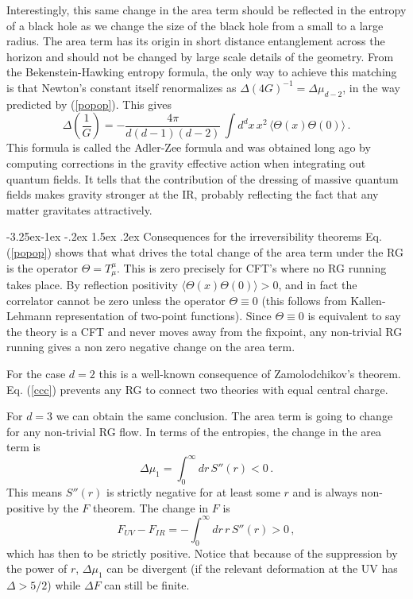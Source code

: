 \documentclass[11pt]{article}
\makeatletter
\renewcommand\subsection{\@startsection{subsection}{2}{\z@}%
                                   {-3.25ex\@plus -1ex \@minus -.2ex}%
                                     {1.5ex \@plus .2ex}%
                                     {\normalfont\bfseries}}
\numberwithin{equation}{section}
\newcommand{\be}{\begin{equation}}
\newcommand{\ee}{\end{equation}}
\makeatother
\begin{document}
\bigskip

Interestingly, this same change in the area term should be reflected in the entropy of a black hole as we change the size of the black hole from a small to a large radius. The area term has its origin in short distance entanglement across the horizon and should not be changed by large scale details of the geometry. From the Bekenstein-Hawking entropy formula, the only way to achieve this matching is that Newton's constant itself renormalizes as $\Delta (4G)^{-1}=\Delta \mu_{d-2}$, in the way predicted by (\ref{popop}). This gives
\be
\Delta \left(\frac{1}{G}\right)= -\frac{4\pi}{d (d-1)(d-2)}\,\int d^{d}x\,x^2\,\langle \Theta(x) \Theta(0)\rangle\,.
\ee
This formula is called the Adler-Zee formula and was obtained long ago by computing corrections in the gravity effective action when integrating out quantum fields. It tells that the contribution of the dressing of massive quantum fields makes gravity stronger at the IR, probably reflecting the fact that any matter gravitates attractively.     

\subsection{Consequences for the irreversibility theorems}
Eq. (\ref{popop}) shows that what drives the total change of the area term under the RG is the operator $\Theta=T_\mu^\mu$. This is zero precisely for CFT's where no RG running takes place. By reflection positivity $\langle \Theta(x) \Theta(0)\rangle>0$, and in fact the correlator cannot be zero unless the operator $\Theta\equiv 0$ (this follows from Kallen-Lehmann representation of two-point functions). Since $\Theta\equiv 0$ is equivalent to say the theory is a CFT and never moves away from the fixpoint, any non-trivial RG running gives a non zero negative change on the area term. 

For the case $d=2$ this is a well-known consequence of Zamolodchikov's theorem. Eq. (\ref{ccc}) prevents any RG to connect two theories with equal central charge.     

For $d=3$ we can obtain the same conclusion. The area term is going to change for any non-trivial RG flow. In terms of the entropies, the change in the area term is
\be
\Delta \mu_{1}= \int_0^\infty dr\, S''(r)<0\,.
\ee
This means $S''(r)$ is strictly negative for at least some $r$ and is always non-positive by the $F$ theorem. The change in $F$ is
\be
 F_{UV}-F_{IR}= -\int_0^\infty dr\, r\, S''(r)>0\,,
\ee
which has then to be strictly positive. Notice that because of the suppression by the power of $r$, $\Delta \mu_1$ can be divergent (if the relevant deformation at the UV has $\Delta> 5/2$) while $\Delta F$ can still be finite. 
\end{document}
